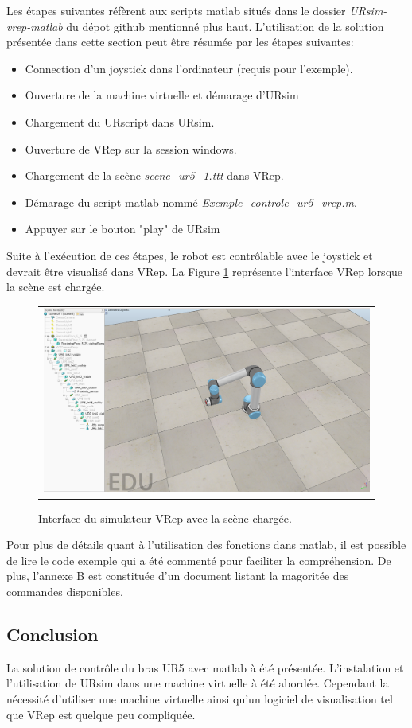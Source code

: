 \documentclass[root.tex]{subfiles}
\begin{document}
Les étapes suivantes réfèrent aux scripts matlab situés dans le dossier \textit{URsim-vrep-matlab} du dépot github mentionné plus haut.
L'utilisation de la solution présentée dans cette section peut être résumée par les étapes suivantes:

\begin{itemize}
\item Connection d'un joystick dans l'ordinateur (requis pour l'exemple).
\item Ouverture de la machine virtuelle et démarage d'URsim
\item Chargement du URscript dans URsim.
\item Ouverture de VRep sur la session windows.
\item Chargement de la scène \textit{scene\_ur5\_1.ttt} dans VRep.
\item Démarage du script matlab nommé \textit{Exemple\_controle\_ur5\_vrep.m}.
\item Appuyer sur le bouton "play" de URsim
\end{itemize}

Suite à l'exécution de ces étapes, le robot est contrôlable avec le joystick et devrait être visualisé dans VRep. La Figure \ref{fig:vrep_scene} représente l'interface VRep lorsque la scène est chargée.
\begin{figure}
 \begin{center}
  \begin{tabular}{c}
    \includegraphics[trim=0cm 0cm 0cm 0cm, scale=0.25]{vrep_ur.png}
  \end{tabular}
 \end{center}
\caption{Interface du simulateur VRep avec la scène chargée.}
 \label{fig:vrep_scene}
\end{figure}
Pour plus de détails quant à l'utilisation des fonctions dans matlab, il est possible de lire le code exemple qui a été commenté pour faciliter la compréhension. De plus, l'annexe B est constituée d'un document listant la magoritée des commandes disponibles.

\subsection{Conclusion}

La solution de contrôle du bras UR5 avec matlab à été présentée.
L'instalation et l'utilisation de URsim dans une machine virtuelle à été abordée.
Cependant la nécessité d'utiliser une machine virtuelle ainsi qu'un logiciel de visualisation tel que VRep est quelque peu compliquée.


\newpage
\end{document}
